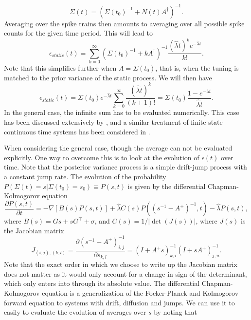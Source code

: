 \[
\Sigma(t) = \left(\Sigma(t_0)^{-1} + N(t) A^\dagger\right)^{-1}.
\]
Averaging over the spike trains then amounts to averaging over all possible spike counts for the given time period. This will lead to
\begin{equation}
\epsilon_{static}(t) = \sum_{k=0}^\infty  \left(\Sigma(t_0)^{-1} + k A^\dagger\right)^{-1} \frac{ (\hat{\lambda}t)^k e^{-\hat{\lambda} t }}{k!}.
\end{equation}
Note that this simplifies further when $A = \Sigma(t_0)$, that is, when the tuning is matched to the prior variance of the static process. We will then have
\begin{equation}
\epsilon_{static}(t) =\Sigma(t_0)e^{-\hat{\lambda} t}  \sum_{k=0}^\infty  \frac{ (\hat{\lambda}t)^k }{(k+1)!} = \Sigma(t_0) \frac{1-e^{-\hat{\lambda} t }}{\hat{\lambda} t}.
\end{equation}
In the general case, the infinite sum has to be evaluated numerically. This case has been discussed extensively by \citet{Yaeli2010}, and a similar treatment of finite state continuous time systems has been considered in \citet{Bobrowski2009}.\par
When considering the general case, though the average can not be evaluated explicitly. One way to overcome this is to look at the evolution of $\epsilon(t)$ over time. Note that the posterior variance process is a simple drift-jump process with a constant jump rate. The evolution of the probability $P(\Sigma(t) = s | \Sigma(t_0) = s_0) \equiv P(s,t)$ is given by the differential Chapman-Kolmogorov equation\cite{Gardiner2004}
\begin{equation}
\label{eq:sigma_DCKE}
\frac{\partial P(s,t)}{\partial t} = -\nabla \left[B(s) P(s,t)\right] + \hat{\lambda} C(s) P\left( (s^{-1} - A^+)^{-1},t\right) - \hat{\lambda} P(s,t),
\end{equation}
where $B(s) = G s + s G^\top + \sigma$, and  $C(s) = 1/|\det(J(s))|$, where $J(s)$ is the Jacobian matrix
\[
J_{(i,j),(k,l)} = \frac{\partial (s^{-1}+A^+)^{-1}_{i,j}}{\partial s_{k,l}} = (I+A^+s)^{-1}_{k,i}(I+s A^+)^{-1}_{j,n}.
\]
Note that the exact order in which we choose to write up the Jacobian matrix does not matter as it would only account for a change in sign of the determinant, which only enters into  through its absolute value. The differential Chapman-Kolmogorov equation is a generalization of the Focker-Planck and Kolmogorov forward equation to systems with drift, diffusion and jumps. We can use it to easily to evaluate the evolution of averages over $s$ by noting that
